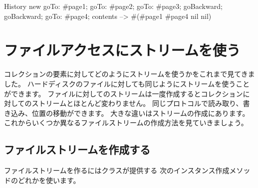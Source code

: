 \documentclass[a4paper,10pt,twoside]{book}
\begin{document}
\begin{code}{}
History new
	goTo: #page1;
	goTo: #page2;
	goTo: #page3;
	goBackward;
	goBackward;
	goTo: #page4;
	contents --> #(#page1 #page4 nil nil)
\end{code}

\section{ファイルアクセスにストリームを使う}

コレクションの要素に対してどのようにストリームを使うかをこれまで見てきました。
ハードディスクのファイルに対しても同じようにストリームを使うことができます。
ファイルに対してのストリームは一度作成するとコレクションに対してのストリームとほとんど変わりません。
同じプロトコルで読み取り、書き込み、位置の移動ができます。
大きな違いはストリームの作成にあります。
これからいくつか異なるファイルストリームの作成方法を見ていきましょう。


\subsection{ファイルストリームを作成する}


ファイルストリームを作るにはクラスが提供する
次のインスタンス作成メソッドのどれかを使います。
\end{document}
